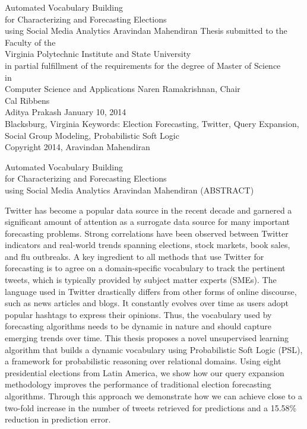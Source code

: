 \documentclass[11pt]{report}
\begin{document}
\thispagestyle{empty}

\begin{center}
{\Large 
Automated Vocabulary Building\\
for Characterizing and Forecasting Elections\\
using Social Media Analytics
}
\vfill
Aravindan Mahendiran
\vfill
Thesis submitted to the Faculty of the \\
Virginia Polytechnic Institute and State University \\
in partial fulfillment of the requirements for the degree of
\vfill
Master of Science \\
in \\
Computer Science and Applications
\vfill
Naren Ramakrishnan, Chair \\
Cal Ribbens \\
Aditya Prakash
\vfill
January 10, 2014 \\
Blacksburg, Virginia
\vfill
Keywords: Election Forecasting, Twitter, Query Expansion, Social Group Modeling, Probabilistic Soft Logic \\
Copyright 2014, Aravindan Mahendiran
\end{center}
\pagebreak
\thispagestyle{empty}

\begin{center}
{\large Automated Vocabulary Building\\
for Characterizing and Forecasting Elections\\
using Social Media Analytics}
\vfill
Aravindan Mahendiran
\vfill
(ABSTRACT)
\vfill
\end{center}
Twitter has become a popular data source in the recent decade and garnered a significant amount
of attention as a surrogate data source for many important forecasting problems.
Strong correlations have been observed between Twitter indicators
and real-world trends spanning elections,
stock markets, book sales, and flu outbreaks.
A key ingredient to all methods that use Twitter for forecasting is to agree on a domain-specific
vocabulary to track the pertinent tweets, which is typically provided by subject matter experts (SMEs).
The language used in Twitter drastically differs from other forms of online discourse,
such as news articles and blogs.
It constantly evolves over time as users adopt popular hashtags to express their opinions.
Thus, the vocabulary used by forecasting algorithms needs to be dynamic in nature and should capture emerging 
trends over time.
This thesis proposes a novel unsupervised learning algorithm that
builds a dynamic vocabulary using Probabilistic Soft Logic (PSL), a framework for probabilistic reasoning over 
relational domains. Using eight presidential elections from Latin America, we show how our query expansion methodology 
improves the performance of traditional election forecasting algorithms. 
Through this approach we demonstrate how we can achieve close to a two-fold increase in the number of tweets
retrieved for predictions and a 15.58\% reduction in prediction error. 
\pagebreak
\end{document}
